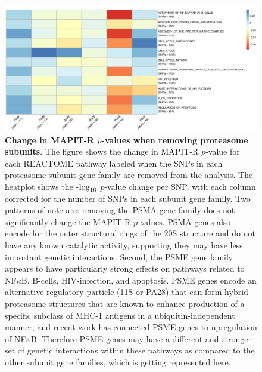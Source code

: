 \documentclass[12pt,a4paper]{article}
\def\log{{\rm log}}
\begin{document}
\begin{figure}[]
\centering
\includegraphics[scale=.45]{Images/Main/InterPath_Main_Figure_Proteasome_vs1.png}
\caption[TBD]{\textbf{Change in MAPIT-R $p$-values when removing proteasome subunits}. The figure shows the change in MAPIT-R $p$-value for each REACTOME pathway labeled when the SNPs in each proteasome subunit gene family are removed from the analysis. The heatplot shows the -$\log_{10}$ $p$-value change per SNP, with each column corrected for the number of SNPs in each subunit gene family. Two patterns of note are: removing the PSMA gene family does not significantly change the MAPIT-R $p$-values. PSMA genes also encode for the outer structural rings of the 20S structure and do not have any known catalytic activity, supporting they may have less important genetic interactions. Second, the PSME gene family appears to have particularly strong effects on pathways related to NF$\kappa$B, B-cells, HIV-infection, and apoptosis. PSME genes encode an alternative regulatory particle (11S or PA28) that can form hybrid-proteasome structures that are known to enhance production of a specific subclass of MHC-1 antigens in a ubiquitin-independent manner, and recent work has connected PSME genes to upregulation of NF$\kappa$B. Therefore PSME genes may have a different and stronger set of genetic interactions within these pathways as compared to the other subunit gene families, which is getting represented here.
}
\label{InterPath-Main-Figure-Proteasome-Heatplot}
\end{figure}



\end{document}
